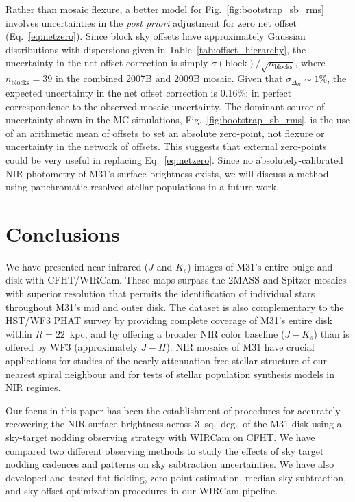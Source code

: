 \documentclass[iop,tighten]{emulateapj}
\newcommand{\Fig}[1]{Fig.~\ref{fig:#1}}  %
\newcommand{\Eq}[1]{Eq.~\ref{eq:#1}}  %
\newcommand{\Tab}[1]{Table~\ref{tab:#1}}  %
\begin{document}
Rather than mosaic flexure, a better model for \Fig{bootstrap_sb_rms} involves uncertainties in the \textit{post priori} adjustment for zero net offset (\Eq{netzero}).
Since block sky offsets have approximately Gaussian distributions with dispersions given in \Tab{offset_hierarchy}, the uncertainty in the net offset correction is simply $\sigma(\mathrm{block})/\sqrt{n_\mathrm{blocks}}$, where $n_\mathrm{blocks}=39$ in the combined 2007B and 2009B mosaic.
Given that $\sigma_{\Delta_B}\sim 1\%$, the expected uncertainty in the net offset correction is 0.16\%: in perfect correspondence to the observed mosaic uncertainty.
The dominant source of uncertainty shown in the MC simulations, \Fig{bootstrap_sb_rms}, is the use of an arithmetic mean of offsets to set an absolute zero-point, not flexure or uncertainty in the network of offsets.
This suggests that external zero-points could be very useful in replacing \Eq{netzero}.
Since no absolutely-calibrated NIR photometry of M31's surface brightness exists, we will discuss a method using panchromatic resolved stellar populations in a future work.

\section{Conclusions}
\label{sec:conclusions}

We have presented near-infrared ($J$ and $K_s$) images of M31's entire bulge and disk with CFHT/WIRCam.
These maps surpass the 2MASS \citep{Beaton:2007} and Spitzer \citep{Barmby:2006} mosaics with superior resolution that permits the identification of individual stars throughout M31's mid and outer disk.
The dataset is also complementary to the HST/WF3 PHAT survey \citep{Dalcanton:2012} by providing complete coverage of M31's entire disk within $R=22$~kpc, and by offering a broader NIR color baseline ($J-K_s$) than is offered by WF3 (approximately $J-H$).
NIR mosaics of M31 have crucial applications for studies of the nearly attenuation-free stellar structure of our nearest spiral neighbour and for tests of stellar population synthesis models in NIR regimes.

Our focus in this paper has been the establishment of procedures for accurately recovering the NIR surface brightness across 3~sq.~deg.\ of the M31 disk using a sky-target nodding observing strategy with WIRCam on CFHT\@.
We have compared two different observing methods to study the effects of sky target nodding cadences and patterns on sky subtraction uncertainties.
We have also developed and tested flat fielding, zero-point estimation, median sky subtraction, and sky offset optimization procedures in our WIRCam pipeline.
\end{document}
